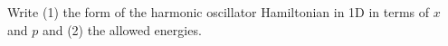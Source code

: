 

\vspace*{\fill}
\centering

Write (1) the form of the harmonic oscillator Hamiltonian in 1D in terms of $x$ and $p$ and (2) the allowed energies.

\centering
\vspace*{\fill}


